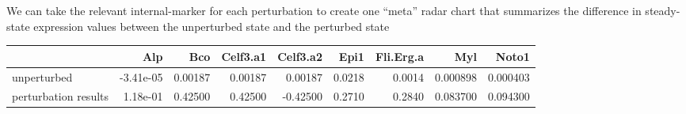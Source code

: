 \documentclass[
]{book}
\begin{document}
We can take the relevant internal-marker for each perturbation to create one ``meta'' radar chart that summarizes the difference in steady-state expression values between the unperturbed state and the perturbed state

\begin{table}
\centering\begingroup\fontsize{8}{10}\selectfont

\begin{tabular}{l|r|r|r|r|r|r|r|r}
\hline
  & Alp & Bco & Celf3.a1 & Celf3.a2 & Epi1 & Fli.Erg.a & Myl & Noto1\\
\hline
unperturbed & -3.41e-05 & 0.00187 & 0.00187 & 0.00187 & 0.0218 & 0.0014 & 0.000898 & 0.000403\\
\hline
perturbation results & 1.18e-01 & 0.42500 & 0.42500 & -0.42500 & 0.2710 & 0.2840 & 0.083700 & 0.094300\\
\hline
\end{tabular}
\endgroup{}
\end{table}
\end{document}
